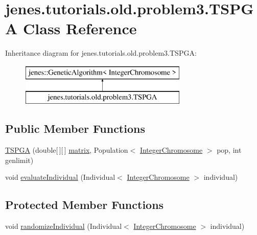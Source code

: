 \hypertarget{classjenes_1_1tutorials_1_1old_1_1problem3_1_1_t_s_p_g_a}{\section{jenes.\-tutorials.\-old.\-problem3.\-T\-S\-P\-G\-A Class Reference}
\label{classjenes_1_1tutorials_1_1old_1_1problem3_1_1_t_s_p_g_a}
}
Inheritance diagram for jenes.\-tutorials.\-old.\-problem3.\-T\-S\-P\-G\-A\-:\begin{figure}[H]
\begin{center}
\leavevmode
\includegraphics[height=2.000000cm]{classjenes_1_1tutorials_1_1old_1_1problem3_1_1_t_s_p_g_a}
\end{center}
\end{figure}
\subsection*{Public Member Functions}
\begin{DoxyCompactItemize}
\item 
\hyperlink{classjenes_1_1tutorials_1_1old_1_1problem3_1_1_t_s_p_g_a_aee42308116b327b1b73b5996bcb39aba}{T\-S\-P\-G\-A} (double\mbox{[}$\,$\mbox{]}\mbox{[}$\,$\mbox{]} \hyperlink{classjenes_1_1tutorials_1_1old_1_1problem3_1_1_t_s_p_g_a_a1613f59b74e07f37759305abfd0d26b0}{matrix}, Population$<$ \hyperlink{classjenes_1_1chromosome_1_1_integer_chromosome}{Integer\-Chromosome} $>$ pop, int genlimit)
\item 
void \hyperlink{classjenes_1_1tutorials_1_1old_1_1problem3_1_1_t_s_p_g_a_a4485dcb637c0d0352c4372e4bef4da18}{evaluate\-Individual} (Individual$<$ \hyperlink{classjenes_1_1chromosome_1_1_integer_chromosome}{Integer\-Chromosome} $>$ individual)
\end{DoxyCompactItemize}
\subsection*{Protected Member Functions}
\begin{DoxyCompactItemize}
\item 
void \hyperlink{classjenes_1_1tutorials_1_1old_1_1problem3_1_1_t_s_p_g_a_ae2fb356349da4c72fec6398f226877c9}{randomize\-Individual} (Individual$<$ \hyperlink{classjenes_1_1chromosome_1_1_integer_chromosome}{Integer\-Chromosome} $>$ individual)
\end{DoxyCompactItemize}
